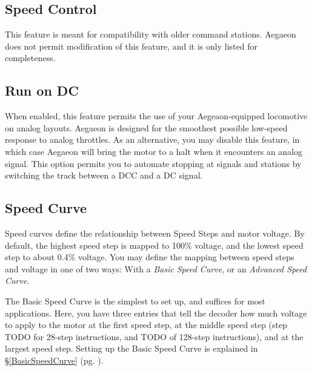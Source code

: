 \documentclass[12pt,letterpaper,draft]{memoir} %
\begin{document}
\subsection{Speed Control}
\label{CV29speedcontrol}
This feature is meant for compatibility with older command stations. Aegaeon does not permit modification of this feature, and it is only listed for completeness. %

\subsection{Run on DC}
\label{CV29runondc}
When enabled, this feature permits the use of your Aegeaon-equipped locomotive on analog layouts. Aegaeon is designed for the smoothest possible low-speed response to analog throttles. As an alternative, you may disable this feature, in which case Aegaeon will bring the motor to a halt when it encounters an analog signal. This option permits you to automate stopping at signals and stations by switching the track between a DCC and a DC signal.

\subsection{Speed Curve}
\label{CV29SpeedCurve}
Speed curves define the relationship between Speed Steps and motor voltage. By default, the highest speed step is mapped to 100\% voltage, and the lowest speed step to about 0.4\% voltage. You may define the mapping between speed steps and voltage in one of two ways: With a \textit{Basic Speed Curve}, or an \textit{Advanced Speed Curve}.

The Basic Speed Curve is the simplest to set up, and suffices for most applications. Here, you have three entries that tell the decoder how much voltage to apply to the motor at the first speed step, at the middle speed step (step TODO for 28-step instructions, and TODO of 128-step instructions), and at the largest speed step. Setting up the Basic Speed Curve is explained in \S\ref{BasicSpeedCurve} (pg. \pageref{BasicSpeedCurve}).
\end{document}
